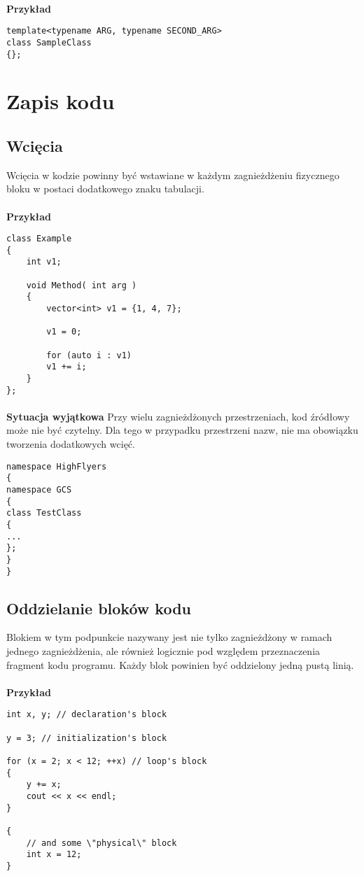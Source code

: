 \documentclass[titlepage]{article}
\begin{document}
\paragraph{}
\textbf{Przykład}
\begin{lstlisting}
template<typename ARG, typename SECOND_ARG>
class SampleClass
{};

\end{lstlisting}

\section{Zapis kodu}
\subsection{Wcięcia}
Wcięcia w kodzie powinny być wstawiane w każdym zagnieżdżeniu fizycznego bloku w postaci dodatkowego znaku tabulacji.
\paragraph{}
\textbf{Przykład}
\begin{lstlisting}
class Example
{
	int v1;

	void Method( int arg )
	{
		vector<int> v1 = {1, 4, 7};

		v1 = 0;

		for (auto i : v1)
		v1 += i;
	}
};
\end{lstlisting}
\paragraph{}
\textbf{Sytuacja wyjątkowa}
Przy wielu zagnieżdżonych przestrzeniach, kod źródłowy może nie być czytelny. Dla tego w przypadku przestrzeni nazw, nie ma obowiązku tworzenia dodatkowych wcięć.
\begin{lstlisting}
namespace HighFlyers
{
namespace GCS
{
class TestClass
{
...
};
}
}
\end{lstlisting}

\subsection{Oddzielanie bloków kodu}
Blokiem w tym podpunkcie nazywany jest nie tylko zagnieżdżony w ramach jednego zagnieżdżenia, ale również logicznie pod względem przeznaczenia fragment kodu programu. Każdy blok powinien być oddzielony jedną pustą linią.
\paragraph{}
\textbf{Przykład}
\begin{lstlisting}
int x, y; // declaration's block

y = 3; // initialization's block

for (x = 2; x < 12; ++x) // loop's block
{
	y += x;
	cout << x << endl;
}

{
	// and some \"physical\" block
	int x = 12;
}
\end{lstlisting}
\end{document}
